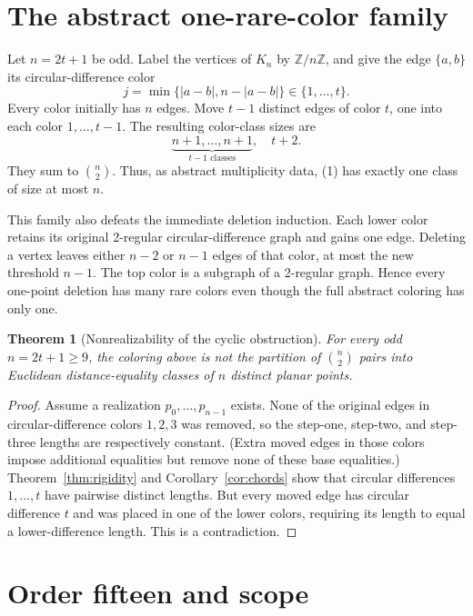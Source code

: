 \documentclass[11pt]{article}
\newtheorem{theorem}{Theorem}
\newcommand{\Z}{\mathbb Z}
\begin{document}
\section{The abstract one-rare-color family}

Let $n=2t+1$ be odd.  Label the vertices of $K_n$ by $\Z/n\Z$, and give
the edge $\{a,b\}$ its circular-difference color
\[
  j=\min\{|a-b|,n-|a-b|\}\in\{1,\ldots,t\}.
\]
Every color initially has $n$ edges.  Move $t-1$ distinct edges of color
$t$, one into each color $1,\ldots,t-1$.  The resulting color-class sizes
are
\[
  \underbrace{n+1,\ldots,n+1}_{t-1\text{ classes}},\quad t+2.
  \tag{1}
\]
They sum to $\binom n2$.  Thus, as abstract multiplicity data, (1) has
exactly one class of size at most $n$.

This family also defeats the immediate deletion induction.  Each lower
color retains its original 2-regular circular-difference graph and gains one
edge.  Deleting a vertex leaves either $n-2$ or $n-1$ edges of that color,
at most the new threshold $n-1$.  The top color is a subgraph of a
2-regular graph.  Hence every one-point deletion has many rare colors even
though the full abstract coloring has only one.

\begin{theorem}[Nonrealizability of the cyclic obstruction]
For every odd $n=2t+1\ge9$, the coloring above is not the partition of
$\binom n2$ pairs into Euclidean distance-equality classes of $n$ distinct
planar points.
\end{theorem}

\begin{proof}
Assume a realization $p_0,\ldots,p_{n-1}$ exists.  None of the original
edges in circular-difference colors $1,2,3$ was removed, so the step-one,
step-two, and step-three lengths are respectively constant.  (Extra moved
edges in those colors impose additional equalities but remove none of these
base equalities.)  Theorem~\ref{thm:rigidity} and
Corollary~\ref{cor:chords} show that circular differences
$1,\ldots,t$ have pairwise distinct lengths.  But every moved edge has
circular difference $t$ and was placed in one of the lower colors, requiring
its length to equal a lower-difference length.  This is a contradiction.
\end{proof}

\section{Order fifteen and scope}
\end{document}
